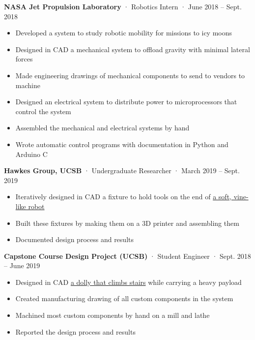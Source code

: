 \documentclass[12pt, oneside]{article}
\newcommand{\jobtitle}[3] {
	{\bf #1} · {#2} · {#3} \vspace{-7pt} \\
}
\begin{document}
\begin{flushleft}
\jobtitle{NASA Jet Propulsion Laboratory}{Robotics Intern}{June 2018 – Sept. 2018}
\begin{itemize}
	\item Developed a system to study robotic mobility for missions to icy moons \\
	\item Designed in CAD a mechanical system to offload gravity with minimal lateral forces \\
	\item Made engineering drawings of mechanical components to send to vendors to machine \\
	\item Designed an electrical system to distribute power to microprocessors that control the system \\
	\item Assembled the mechanical and electrical systems by hand \\
	\item Wrote automatic control programs with documentation in Python and Arduino C
\end{itemize}

\jobtitle{Hawkes Group, UCSB}{Undergraduate Researcher}{March 2019 – Sept. 2019}
\begin{itemize}
	\item Iteratively designed in CAD a fixture to hold tools on the end of \href{https://portfolium.com/entry/vine-robot-tool-mount}{a soft, vine-like robot}
	\item Built these fixtures by making them on a 3D printer and assembling them 
	\item Documented design process and results
\end{itemize}

\jobtitle{Capstone Course Design Project (UCSB)}{Student Engineer}{Sept. 2018 – June 2019}
\begin{itemize}
	\item Designed in CAD \href{https://portfolium.com/entry/automatic-stair-climbing-vehicle}{a dolly that climbs stairs} while carrying a heavy payload
	\item Created manufacturing drawing of all custom components in the system
	\item Machined most custom components by hand on a mill and lathe
	\item Reported the design process and results
\end{itemize}


\end{flushleft}
\end{document}
